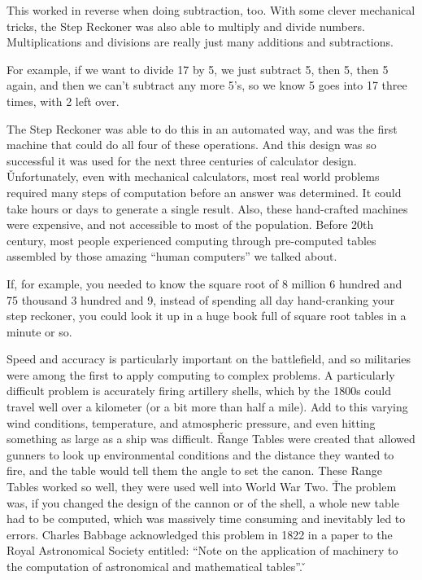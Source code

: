 
This worked in reverse when doing subtraction, too. With some clever mechanical tricks, the Step Reckoner was also
able to multiply and divide numbers. Multiplications and divisions are really just many additions and subtractions.

\be
For example, if we want to divide 17 by 5, we just subtract 5, then 5, then 5 again, and then we can't subtract any
more 5's, so we know 5 goes into 17 three times, with 2 left over.
\ee

The Step Reckoner was able to do this in an automated way, and was the first machine that could do all four of these
operations. And this design was so successful it was used for the next three centuries of calculator design. \v

Unfortunately, even with mechanical calculators, most real world problems required many steps of computation before
an answer was determined. It could take hours or days to generate a single result. Also, these hand-crafted machines
were expensive, and not accessible to most of the population. Before 20th century, most people experienced computing
through pre-computed tables assembled by those amazing ``human computers'' we talked about.

\be
If, for example, you needed to know the square root of 8 million 6 hundred and 75 thousand 3 hundred and 9, instead
of spending all day hand-cranking your step reckoner, you could look it up in a huge book full of square root tables
in a minute or so.
\ee

Speed and accuracy is particularly important on the battlefield, and so militaries were among the first to apply
computing to complex problems. A particularly difficult problem is accurately firing artillery shells, which by the
1800s could travel well over a kilometer (or a bit more than half a mile). Add to this varying wind conditions,
temperature, and atmospheric pressure, and even hitting something as large as a ship was difficult. \v

Range Tables were created that allowed gunners to look up environmental conditions and the distance they wanted to
fire, and the table would tell them the angle to set the canon. These Range Tables worked so well, they were used
well into World War Two. \v

The problem was, if you changed the design of the cannon or of the shell, a whole new table had to be computed, which
was massively time consuming and inevitably led to errors. Charles Babbage acknowledged this problem in 1822 in a
paper to the Royal Astronomical Society entitled: ``Note on the application of machinery to the computation of
astronomical and mathematical tables''. \v

